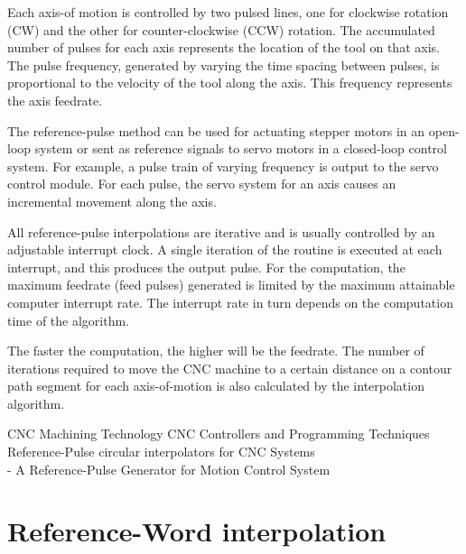 Each axis-of motion is controlled by two pulsed lines, one for clockwise rotation (CW) and the other for counter-clockwise (CCW) rotation. The accumulated number of pulses for each axis represents the location of the tool on that axis. The pulse frequency, generated by varying the time spacing between pulses, is proportional to the velocity of the tool along the axis. This frequency represents the axis feedrate. 
\vspace*{1\baselineskip}

The reference-pulse method can be used for actuating stepper motors in an open-loop system or sent as reference signals to servo motors in a closed-loop control system. For example, a pulse train of varying frequency is output to the servo control module. For each pulse, the servo system for an axis causes an incremental movement along the axis. 
\vspace*{1\baselineskip}

All reference-pulse interpolations are iterative and is usually controlled by an adjustable interrupt clock. A single iteration of the routine is executed at each interrupt, and this produces the output pulse. For the computation, the maximum feedrate (feed pulses) generated is limited by the maximum attainable computer interrupt rate. The interrupt rate in turn depends on the computation time of the algorithm. 
\vspace*{1\baselineskip}

The faster the computation, the higher will be the feedrate. The number of iterations required to move the CNC machine to a certain distance on a contour path segment for each axis-of-motion is also calculated by the interpolation algorithm. 
\vspace*{1\baselineskip}

\begin{tcolorbox}
	
	
\cite{Smith_1993-01}	CNC Machining Technology
\cite{Smith_1993-02} CNC Controllers and Programming Techniques\\	
\cite{Koren_1981} Reference-Pulse circular interpolators for CNC Systems\\
\cite{Giap_2014} - A Reference-Pulse Generator for Motion Control System\\

\end{tcolorbox}

\section{Reference-Word interpolation}

